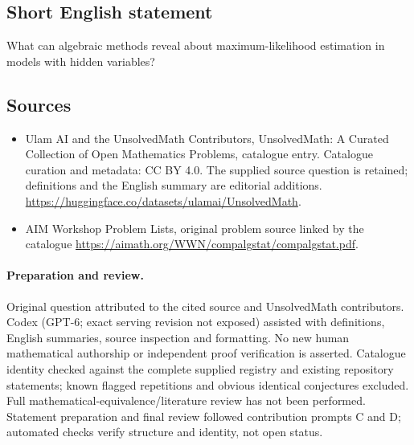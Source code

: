 \documentclass[11pt]{article}
\begin{document}
\subsection{Short English statement}
What can algebraic methods reveal about maximum-likelihood estimation in models with hidden variables?
\subsection{Sources}
\begin{itemize}
\item[\hypertarget{source:statement:1}{S1}] Ulam AI and the UnsolvedMath Contributors, UnsolvedMath: A Curated Collection of Open Mathematics Problems, catalogue entry. Catalogue curation and metadata: CC BY 4.0. The supplied source question is retained; definitions and the English summary are editorial additions.
\url{https://huggingface.co/datasets/ulamai/UnsolvedMath}.
\item[\hypertarget{source:statement:2}{S2}] AIM Workshop Problem Lists, original problem source linked by the catalogue
\url{https://aimath.org/WWN/compalgstat/compalgstat.pdf}.
\end{itemize}
\paragraph{Preparation and review.}
Original question attributed to the cited source and UnsolvedMath contributors. Codex (GPT-6; exact serving revision not exposed) assisted with definitions, English summaries, source inspection and formatting. No new human mathematical authorship or independent proof verification is asserted. Catalogue identity checked against the complete supplied registry and existing repository statements; known flagged repetitions and obvious identical conjectures excluded. Full mathematical-equivalence/literature review has not been performed. Statement preparation and final review followed contribution prompts C and D; automated checks verify structure and identity, not open status.
\label{end:statement}
\end{document}
